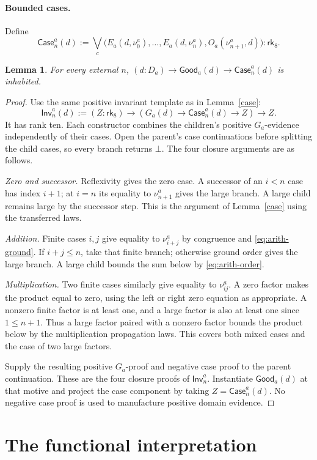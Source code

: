 \documentclass[11pt,a4paper]{article}
\newcommand{\rk}[1]{\mathsf{rk}_{#1}}
\newcommand{\Da}{D_{\!a}}
\newcommand{\Ga}{G_a}
\newcommand{\Ea}{E_a}
\newcommand{\Oa}{O_a}
\newcommand{\Gooda}{\mathsf{Good}_a}
\newcommand{\Casea}{\mathsf{Case}^{a}}
\newcommand{\Inva}{\mathsf{Inv}^{a}}
\newcommand{\nua}[1]{\nu^{a}_{#1}}
\newtheorem{lemma}{Lemma}
\theoremstyle{remark}\newtheorem*{remark}{Remark}
\begin{document}
\paragraph{Bounded cases.}
Define
\[
 \Casea_n(d):=\bigvee_c\bigl(
 \Ea(d,\nua0),\ldots,\Ea(d,\nua n),\Oa(\nua{n+1},d)\bigr):\rk8.
\]
\begin{lemma}\label{lem:arith-cases}
For every external $n$, $(d:\Da)\to\Gooda(d)\to\Casea_n(d)$ is inhabited.
\end{lemma}
\begin{proof}
Use the same positive invariant template as in Lemma~\ref{case}:
\[
 \Inva_n(d):=(Z:\rk8)\to(\Ga(d)\to\Casea_n(d)\to Z)\to Z.
\]
It has rank ten. Each constructor combines the children's positive
$\Ga$-evidence independently of their cases. Open the parent's case
continuations before splitting the child cases, so every branch returns
$\bot$. The four closure arguments are as follows.

\emph{Zero and successor.} Reflexivity gives the zero case. A successor
of an $i<n$ case has index $i+1$; at $i=n$ its equality to $\nua{n+1}$
gives the large branch. A large child remains large by the successor
step. This is the argument of Lemma~\ref{case} using the transferred laws.

\emph{Addition.} Finite cases $i,j$ give equality to $\nua{i+j}$ by
congruence and \eqref{eq:arith-ground}. If $i+j\le n$, take that finite
branch; otherwise ground order gives the large branch. A large child
bounds the sum below by \eqref{eq:arith-order}.

\emph{Multiplication.} Two finite cases similarly give equality to
$\nua{ij}$. A zero factor makes the product equal to zero, using the left
or right zero equation as appropriate. A nonzero finite factor is at
least one, and a large factor is also at least one since $1\le n+1$.
Thus a large factor paired with a nonzero factor bounds the product
below by the multiplication propagation laws. This covers both mixed
cases and the case of two large factors.

Supply the resulting positive $\Ga$-proof and negative case proof to the
parent continuation. These are the four closure proofs of $\Inva_n$.
Instantiate $\Gooda(d)$ at that motive and project the case component by
taking $Z=\Casea_n(d)$. No negative case proof is used to manufacture
positive domain evidence.
\end{proof}

\section{The functional interpretation}\label{sec:functional}
\end{document}
